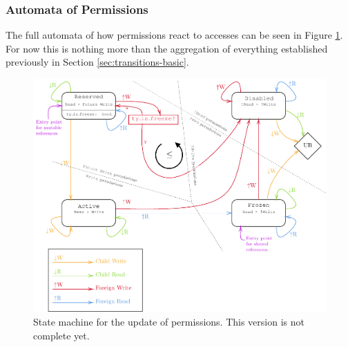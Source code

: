 \documentclass[a4paper,11pt]{article}
\theoremstyle{plain}
\theoremstyle{definition}
\theoremstyle{remark}
\begin{document}
\subsubsection{Automata of Permissions}

The full automata of how permissions react to accesses can be seen in Figure \ref{fig:state-machine-noprotect}.
For now this is nothing more than the aggregation of everything established previously in Section \ref{sec:transitions-basic}.

\begin{figure}
    \includegraphics[width=\textwidth]{../figs/state-machine_noprotect.pdf}
    \caption{State machine for the update of permissions. This version is not complete yet.}
    \label{fig:state-machine-noprotect}
\end{figure}
\end{document}

